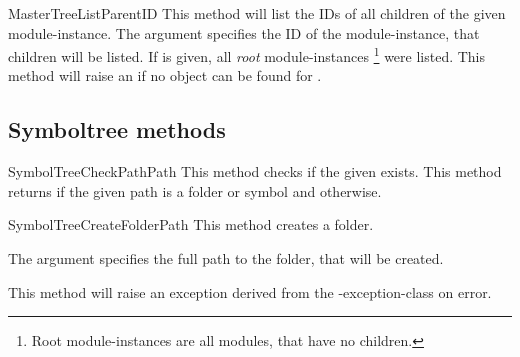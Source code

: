 \begin{methoddesc}[Core]{MasterTreeList}{ParentID}
This method will list the IDs of all children of the given module-instance. The argument  specifies the 
ID of the module-instance, that children will be listed. If  is given, all \emph{root} 
module-instances \footnote{Root module-instances are all modules, that have no children.}
were listed. This method will raise an  if no object can be found for
.
\end{methoddesc}


\subsection{Symboltree methods}
\begin{methoddesc}[Core]{SymbolTreeCheckPath}{Path}
This method checks if the given  exists. This method returns   if the given path is a folder or symbol
and  otherwise.
\end{methoddesc}


\begin{methoddesc}[Core]{SymbolTreeCreateFolder}{Path}
This method creates a folder. 

The argument  specifies the full path to the folder, that will be created. 

This method will raise an exception derived from the -exception-class on error. 
\end{methoddesc}



